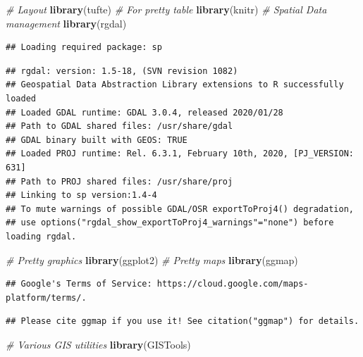 \documentclass[
]{book}
\newenvironment{Shaded}{\begin{snugshade}}{\end{snugshade}}
\newcommand{\CommentTok}[1]{\textcolor[rgb]{0.56,0.35,0.01}{\textit{#1}}}
\newcommand{\KeywordTok}[1]{\textcolor[rgb]{0.13,0.29,0.53}{\textbf{#1}}}
\newcommand{\NormalTok}[1]{#1}
\begin{document}
\begin{Shaded}
\begin{Highlighting}[]
\CommentTok{# Layout}
\KeywordTok{library}\NormalTok{(tufte)}
\CommentTok{# For pretty table}
\KeywordTok{library}\NormalTok{(knitr)}
\CommentTok{# Spatial Data management}
\KeywordTok{library}\NormalTok{(rgdal)}
\end{Highlighting}
\end{Shaded}

\begin{verbatim}
## Loading required package: sp
\end{verbatim}

\begin{verbatim}
## rgdal: version: 1.5-18, (SVN revision 1082)
## Geospatial Data Abstraction Library extensions to R successfully loaded
## Loaded GDAL runtime: GDAL 3.0.4, released 2020/01/28
## Path to GDAL shared files: /usr/share/gdal
## GDAL binary built with GEOS: TRUE 
## Loaded PROJ runtime: Rel. 6.3.1, February 10th, 2020, [PJ_VERSION: 631]
## Path to PROJ shared files: /usr/share/proj
## Linking to sp version:1.4-4
## To mute warnings of possible GDAL/OSR exportToProj4() degradation,
## use options("rgdal_show_exportToProj4_warnings"="none") before loading rgdal.
\end{verbatim}

\begin{Shaded}
\begin{Highlighting}[]
\CommentTok{# Pretty graphics}
\KeywordTok{library}\NormalTok{(ggplot2)}
\CommentTok{# Pretty maps}
\KeywordTok{library}\NormalTok{(ggmap)}
\end{Highlighting}
\end{Shaded}

\begin{verbatim}
## Google's Terms of Service: https://cloud.google.com/maps-platform/terms/.
\end{verbatim}

\begin{verbatim}
## Please cite ggmap if you use it! See citation("ggmap") for details.
\end{verbatim}

\begin{Shaded}
\begin{Highlighting}[]
\CommentTok{# Various GIS utilities}
\KeywordTok{library}\NormalTok{(GISTools)}
\end{Highlighting}
\end{Shaded}
\end{document}
